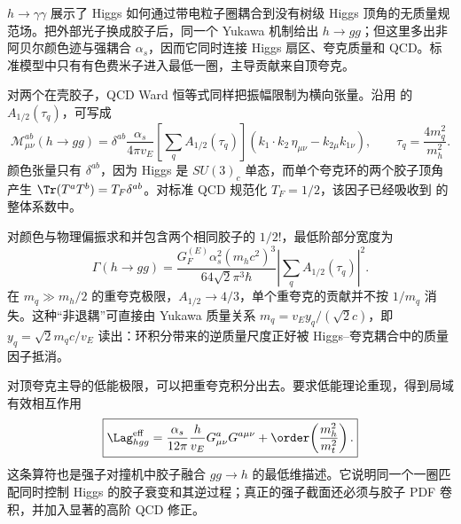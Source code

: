 
$h\to\gamma\gamma$ 展示了 Higgs 如何通过带电粒子圈耦合到没有树级 Higgs 顶角的无质量规范场。把外部光子换成胶子后，同一个 Yukawa 机制给出 $h\to gg$；但这里多出非阿贝尔颜色迹与强耦合 $\alpha_s$，因而它同时连接 Higgs 扇区、夸克质量和 QCD。标准模型中只有有色费米子进入最低一圈，主导贡献来自顶夸克。

对两个在壳胶子，QCD Ward 恒等式同样把振幅限制为横向张量。沿用 的 $A_{1/2}(\tau_q)$，可写成
\begin{equation}
\boxed{
\mathcal M^{ab}_{\mu\nu}(h\to gg)
=\delta^{ab}\frac{\alpha_s}{4\pi v_E}
\left[\sum_qA_{1/2}(\tau_q)\right]
\left(k_1\!\cdot k_2\,\eta_{\mu\nu}-k_{2\mu}k_{1\nu}\right),
\qquad
\tau_q=\frac{4m_q^2}{m_h^2}.}
\label{eq:sm-hgg-amplitude-dp94}
\end{equation}
颜色张量只有 $\delta^{ab}$，因为 Higgs 是 $SU(3)_c$ 单态，而单个夸克环的两个胶子顶角产生 $\Tr(T^aT^b)=T_F\delta^{ab}$。对标准 QCD 规范化 $T_F=1/2$，该因子已经吸收到 的整体系数中。

对颜色与物理偏振求和并包含两个相同胶子的 $1/2!$，最低阶部分宽度为
\begin{equation}
\boxed{
\Gamma(h\to gg)
=\frac{G_F^{(E)}\alpha_s^2(m_hc^2)^3}
{64\sqrt2\pi^3\hbar}
\left|\sum_qA_{1/2}(\tau_q)\right|^2.}
\label{eq:sm-hgg-width-dp94}
\end{equation}
在 $m_q\gg m_h/2$ 的重夸克极限，$A_{1/2}\to4/3$，单个重夸克的贡献并不按 $1/m_q$ 消失。这种“非退耦”可直接由 Yukawa 质量关系 $m_q=v_Ey_q/(\sqrt2 c)$，即 $y_q=\sqrt2 m_qc/v_E$ 读出：环积分带来的逆质量尺度正好被 Higgs--夸克耦合中的质量因子抵消。

对顶夸克主导的低能极限，可以把重夸克积分出去。要求低能理论重现，得到局域有效相互作用
\begin{equation}
\boxed{
\Lag_{hgg}^{\rm eff}
=\frac{\alpha_s}{12\pi}\frac{h}{v_E}
G^a_{\mu\nu}G^{a\mu\nu}
+\order\!\left(\frac{m_h^2}{m_t^2}\right).}
\label{eq:sm-hgg-effective-operator-dp94}
\end{equation}
这条算符也是强子对撞机中胶子融合 $gg\to h$ 的最低维描述。它说明同一个一圈匹配同时控制 Higgs 的胶子衰变和其逆过程；真正的强子截面还必须与胶子 PDF 卷积，并加入显著的高阶 QCD 修正。
